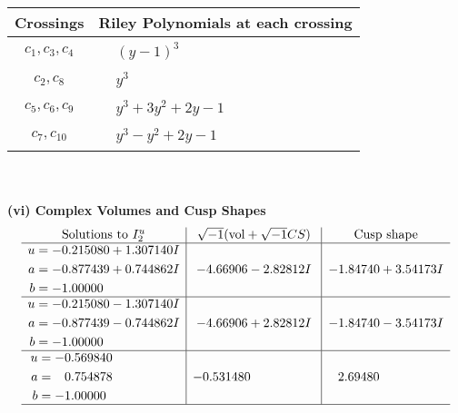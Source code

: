\documentclass[1p]{elsarticle_modified}
\theoremstyle{definition}
\newcommand{\I}{\sqrt{-1}}
\begin{document}
\begin{tabular}{m{50pt}|m{274pt}}
Crossings & \hspace{64pt}Riley Polynomials at each crossing \\
\hline $$\begin{aligned}c_{1},c_{3},c_{4}\end{aligned}$$&$\begin{aligned}
&(y-1)^3
\end{aligned}$\\
\hline $$\begin{aligned}c_{2},c_{8}\end{aligned}$$&$\begin{aligned}
&y^3
\end{aligned}$\\
\hline $$\begin{aligned}c_{5},c_{6},c_{9}\end{aligned}$$&$\begin{aligned}
&y^3+3 y^2+2 y-1
\end{aligned}$\\
\hline $$\begin{aligned}c_{7},c_{10}\end{aligned}$$&$\begin{aligned}
&y^3- y^2+2 y-1
\end{aligned}$\\
\hline
\end{tabular}\\~\\
\newpage\flushleft \textbf{(vi) Complex Volumes and Cusp Shapes}
$$\begin{array}{c|c|c}  
\text{Solutions to }I^u_{2}& \I (\text{vol} + \sqrt{-1}CS) & \text{Cusp shape}\\
 \hline 
\begin{aligned}
u &= -0.215080 + 1.307140 I \\
a &= -0.877439 + 0.744862 I \\
b &= -1.00000\phantom{ +0.000000I}\end{aligned}
 & -4.66906 - 2.82812 I & -1.84740 + 3.54173 I \\ \hline\begin{aligned}
u &= -0.215080 - 1.307140 I \\
a &= -0.877439 - 0.744862 I \\
b &= -1.00000\phantom{ +0.000000I}\end{aligned}
 & -4.66906 + 2.82812 I & -1.84740 - 3.54173 I \\ \hline\begin{aligned}
u &= -0.569840\phantom{ +0.000000I} \\
a &= \phantom{-}0.754878\phantom{ +0.000000I} \\
b &= -1.00000\phantom{ +0.000000I}\end{aligned}
 & -0.531480\phantom{ +0.000000I} & \phantom{-}2.69480\phantom{ +0.000000I}\\
 \hline 
 \end{array}$$\newpage
\end{document}
